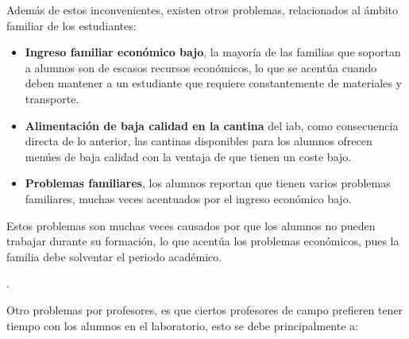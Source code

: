Además de estos inconvenientes, existen otros problemas, relacionados al ámbito
familiar de los estudiantes\cite{iab:tesis_alumnos}:

\begin{itemize}
    \item \textbf{Ingreso familiar económico bajo}, la mayoría de las familias que
        soportan a alumnos son de escasos recursos económicos, lo que se acentúa
        cuando deben mantener a un estudiante que requiere constantemente de
        materiales y transporte.
    \item \textbf{Alimentación de baja calidad en la cantina} del \Gls{iab}, como
        consecuencia directa de lo anterior, las cantinas disponibles para los
        alumnos ofrecen menúes de baja calidad con la ventaja de que tienen un
        coste bajo.
    \item \textbf{Problemas familiares}, los alumnos reportan que tienen varios
        problemas familiares, muchas veces acentuados por el ingreso económico
        bajo.
\end{itemize}


Estos problemas son muchas veces causados por que los alumnos no pueden trabajar
durante su formación, lo que acentúa los problemas económicos, pues la familia
debe solventar el periodo académico.

.

Otro problemas  por
profesores, es que ciertos profesores de campo prefieren tener tiempo con los
alumnos en el laboratorio, esto se debe principalmente a:

